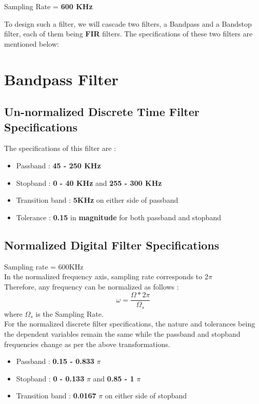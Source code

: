 \documentclass{article}
\begin{document}
Sampling Rate = \textbf{600 KHz}\\
\noindent

To design such a filter, we will cascade two filters, a Bandpass and a Bandstop filter, each of them being \textbf{FIR} filters.
The specifications of these two filters are mentioned below:

\section{\textbf{Bandpass Filter}}
\subsection{\textbf{Un-normalized Discrete Time Filter Specifications}}

\vspace{1.5em}
\noindent
The specifications of this filter are :
\begin{itemize}
    \item Passband : \textbf{45 - 250 KHz}
    \item Stopband : \textbf{0 - 40 KHz} and \textbf{255 - 300 KHz}
    \item  Transition band : \textbf{5KHz} on either side of passband
    \item  Tolerance : \textbf{0.15} in \textbf{magnitude} for both passband and stopband
\end{itemize}


\subsection{Normalized Digital Filter Specifications}
Sampling rate = 600KHz\\
In the normalized frequency axis, sampling rate corresponds to 2$\pi$\\

Therefore, any frequency can be normalized as follows :
\begin{equation*}
    \omega = \frac{\Omega*2\pi}{\Omega_s}
\end{equation*}
where $\Omega_s$ is the Sampling Rate.\\

\vspace{1em}
\noindent
For the normalized discrete filter specifications, the nature and tolerances being the dependent variables remain the same while the passband and stopband frequencies change as per the above transformations. 
\begin{itemize}
    \item Passband : \textbf{0.15 - 0.833} {$\pi$}
    \item Stopband : \textbf{0 -  0.133} {$\pi$} and \textbf{0.85 - 1} {$\pi$}
    \item  Transition band : \textbf{0.0167} $\pi$ on either side of stopband
\end{itemize}
\end{document}
